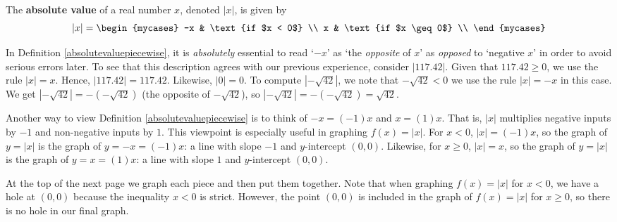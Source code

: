 \colorbox{ResultColor}{\bbm

\begin{defn}

\label{absolutevaluepiecewise}

The \textbf{absolute value} of a real number $x$, denoted $|x|$, is given by \[ |x| =  \begin{mycases} 
      -x &  \text{if $x < 0$} \\
      x & \text{if $x \geq 0$} \\
   \end{mycases} \]

\end{defn}

\ebm}

\medskip

In Definition \ref{absolutevaluepiecewise}, it is \textit{absolutely} essential to read `$-x$' as `the \textit{opposite} of $x$' as \textit{opposed} to `negative $x$' in order to avoid serious errors later.  To see that this description agrees with our previous experience, consider $|117.42|$.  Given that $117.42 \geq 0$, we use the rule $|x| = x$.  Hence, $|117.42| = 117.42$.  Likewise, $|0| = 0$.  To compute $|-\sqrt{42}|$, we note that $-\sqrt{42} < 0$ we use the rule $|x| = -x$ in this case.  We get $|-\sqrt{42}| = -(-\sqrt{42})$ (the opposite of $-\sqrt{42}$), so $|-\sqrt{42}| = -(-\sqrt{42}) = \sqrt{42}$.   

\medskip

Another way to view Definition \ref{absolutevaluepiecewise} is to think of $-x = (-1)x$ and $x = (1)x$.  That is,   $|x|$ multiplies negative inputs by $-1$ and  non-negative inputs by $1$.    This viewpoint is especially useful in graphing  $f(x) = |x|$.  For $x<0$,  $|x| = (-1)x$, so the graph of $y = |x|$ is the graph of  $y = -x = (-1) x$:  a line with slope $-1$ and $y$-intercept $(0,0)$.   Likewise, for $x \geq 0$, $|x| = x$, so the graph of $y = |x|$ is the graph of $y = x = (1)x$:  a line with slope $1$ and $y$-intercept $(0,0)$.  

\medskip

At the top of the next page we graph each piece and then put them together. Note that when graphing $f(x) = |x|$ for $x < 0$, we have a hole at $(0, 0)$ because the inequality $x < 0$ is strict. However, the point $(0, 0)$ is included in the graph of $f(x) = |x|$ for $x \geq 0$, so there is no hole in our final graph.

\newpage

